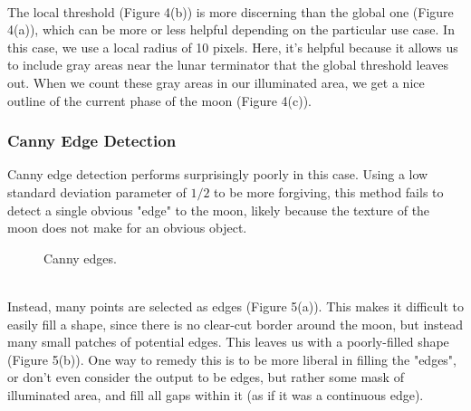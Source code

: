 \documentclass[]{article}
\begin{document}
\\
The local threshold (Figure 4(b)) is more discerning than the global one (Figure 4(a)), which can be more or less helpful depending on the particular use case. In this case, we use a local radius of 10 pixels. Here, it's helpful because it allows us to include gray areas near the lunar terminator that the global threshold leaves out. When we count these gray areas in our illuminated area, we get a nice outline of the current phase of the moon (Figure 4(c)).
\subsubsection*{Canny Edge Detection}
Canny edge detection performs surprisingly poorly in this case. Using a low standard deviation parameter of $1/2$ to be more forgiving, this method fails to detect a single obvious "edge" to the moon, likely because the texture of the moon does not make for an obvious object. 
\begin{figure}[h]
\centering
{}
\caption{Canny edges.}
\end{figure}
\\
Instead, many points are selected as edges (Figure 5(a)). This makes it difficult to easily fill a shape, since there is no clear-cut border around the moon, but instead many small patches of potential edges. This leaves us with a poorly-filled shape (Figure 5(b)). One way to remedy this is to be more liberal in filling the "edges", or don't even consider the output to be edges, but rather some mask of illuminated area, and fill all gaps within it (as if it was a continuous edge).
\pagebreak
\end{document}
